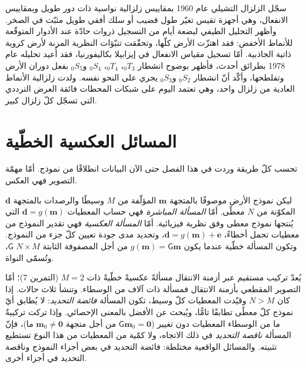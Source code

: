 \begin{history}
سجّل الزلزال التشيلي عام 1960 بمقاييس زلزالية نواسية ذات دور طويل
وبمقاييس الانفعال، وهي أجهزة تقيس تغيّر طول
قضيب أو سلك أفقي طويل مثبّت في الصخر. وأظهر التحليل الطيفي لبضعة أيام من
التسجيل ذروات حادّة عند الأدوار المتوقّعة للأنماط الأخفض: فقد
اهتزّت الأرض كلّها، وتحقّقت تنبّؤات النظرية المرنة
لأرض كروية ذاتية الجاذبية. أمّا تسجيل مقياس الانفعال
في إيزابيلا بكاليفورنيا، فقد أُعيد تحليله عام 1978 بطرائق أحدث،
فأظهر بوضوح انشطار ${}_0T_3$، ${}_0T_4$، ${}_0S_4$
و${}_0S_5$ بفعل دوران الأرض وتفلطحها، وأكّد أنّ
انشطار ${}_0S_2$ و${}_0S_3$ يجري على النحو نفسه.
ولدت زلزالية الأنماط العادية من زلزال واحد، وهي تعتمد اليوم على شبكات
المحطات فائقة العرض الترددي التي تسجّل كلّ زلزال كبير.
\end{history}

\section{المسائل العكسية الخطّية}\label{sec:b3:seismology-imaging:inverse}

تحسب كلّ طريقة وردت في هذا الفصل حتى الآن البيانات انطلاقًا من نموذج. أمّا مهمّة
التصوير فهي العكس.

\begin{definition}\label{def:b3:seismology-imaging:inverse}
ليكن نموذج الأرض موصوفًا بالمتجهة $\mathbf m$ المؤلّفة من $M$ وسيطًا
والرصدات بالمتجهة $\mathbf d$ المكوّنة من $N$ معطًى. أمّا \emph{المسألة
المباشرة} فهي حساب المعطيات $\mathbf d = g(\mathbf m)$
التي يُنتجها نموذج معطى وفق نظرية فيزيائية. أمّا \emph{المسألة
العكسية} فهي تقدير النموذج من معطيات تحمل
أخطاءً، $\mathbf d = g(\mathbf m) + \mathbf e$، وتحديد مدى جودة تعيين كلّ جزء
من النموذج. وتكون المسألة خطّية عندما يكون $g(\mathbf m) =
\mathsf G\mathbf m$ من أجل المصفوفة الثابتة $N\times M$ $\mathsf G$، وتُسمّى النواة.
\end{definition}

يُعدّ تركيب مستقيم عبر أزمنة الانتقال مسألةً عكسيةً خطّيةً ذات
$M = 2$ (التمرين 7)؛ أمّا التصوير المقطعي بأزمنة الانتقال فمسألة ذات آلاف
من الوسطاء. وتنشأ ثلاث حالات. إذا كان $N > M$ وقيّدت المعطيات كلّ
وسيط، تكون المسألة \emph{فائضة التحديد}: لا يُطابق أيّ نموذج كلّ معطًى
تطابقًا تامًّا، ويُبحث عن الأفضل بالمعنى الإحصائي. وإذا تركت تركيبةٌ ما من
الوسطاء المعطيات دون تغيير ($\mathsf G\mathbf m_0 = \mathbf 0$ من أجل
متجهة $\mathbf m_0 \ne \mathbf 0$ ما)، فإنّ المسألة \emph{ناقصة التحديد} في ذلك
الاتجاه، ولا كمّية من المعطيات من هذا النوع تستطيع تثبيته. والمسائل الواقعية
مختلطة: فائضة التحديد في بعض أجزاء النموذج وناقصة التحديد في
أجزاء أخرى.

